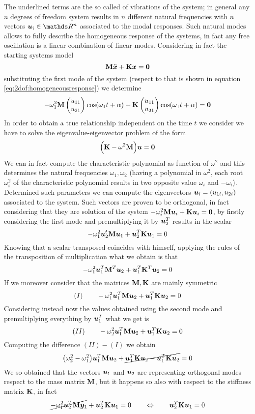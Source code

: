 	The underlined terms are the so called  of vibrations of the system; in general any $n$ degrees of freedom system results in $n$ different natural frequencies with $n$  vectors $\vett u_i \in \mathds R^n$ associated to the modal responses. Such natural modes allows to fully describe the homogeneous response of the systems, in fact any free oscillation is a linear combination of linear modes. Considering in fact the starting systems model
	\[ \mathbf{M} \ddot{\boldsymbol{x}} + \mathbf{K} \boldsymbol{x}= \boldsymbol{0} \]
	substituting the first mode of the system (respect to that is shown in equation \ref{eq:2dof:homogeneousresponse}) we determine
	\[ -\omega_1^2 \mathbf{M} \begin{pmatrix} u_{11} \\ u_{21} \end{pmatrix} \cos(\omega_1 t + \alpha)  + \mathbf{K} \begin{pmatrix} u_{11} \\ u_{21} \end{pmatrix} \cos(\omega_1 t + \alpha) = \boldsymbol{0}  \]
	In order to obtain a true relationship independent on the time $t$ we consider we have to solve the eigenvalue-eigenvector problem of the form
	\[ \Big(\mathbf{K} - \omega^2 \mathbf{M}\Big) \boldsymbol{u} = \boldsymbol{0} \]
	We can in fact compute the characteristic polynomial as function of $\omega^2$ and this determines the natural frequencies $\omega_1, \omega_2$  (having a polynomial in $\omega^2$, each root $\omega_i^2$ of the characteristic polynomial results in two opposite value $\omega_i$ and $-\omega_i$). Determined such parameters we can compute the eigenvectors $\boldsymbol{u}_i = (u_{1i}, u_{2i})$ associated to the system. Such vectors are proven to be orthogonal, in fact considering that they are solution of the system $-\omega_i^2 \mathbf{M} \boldsymbol{u}_i + \mathbf{K} \boldsymbol{u}_i = \boldsymbol{0}$, by firstly considering the first mode and premultiplying it by $\boldsymbol{u}_2^T$ results in the scalar
	\[ -\omega_1^2  \boldsymbol{u}_2^t \mathbf{M} \boldsymbol{u}_1 + \boldsymbol{u}_2^T \mathbf{K} \boldsymbol{u}_1 = 0 \]
	Knowing that a scalar transposed coincides with himself, applying the rules of the transposition of multiplication what we obtain is that
	\[ -\omega_1^2 \boldsymbol{u}_1^T\mathbf{M}^T \boldsymbol{u}_2 + \boldsymbol{u}_1^T \mathbf{K}^T \boldsymbol{u}_2 = 0 \]
	If we moreover consider that the matrices $\mathbf{M},\mathbf{K}$ are mainly symmetric	
	\[ (I) \qquad -\omega_1^2 \boldsymbol{u}_1^T\mathbf{M} \boldsymbol{u}_2 + \boldsymbol{u}_1^T \mathbf{K} \boldsymbol{u}_2 = 0 \]
	Considering instead now the values obtained using the second mode and premultiplying everything by $\boldsymbol{u}_1^T$ what we get is
	\[ (II) \qquad -\omega_2^2 \boldsymbol{u}_1^T \mathbf{M} \boldsymbol{u}_2 + \boldsymbol{u}_1^T \mathbf{K} \boldsymbol{u}_2 = 0 \]
	Computing the difference $(II)-(I)$ we obtain
	\[ \big(\omega_2^2-\omega_1^2\big) \boldsymbol{u}_1^T \mathbf{M} \boldsymbol{u}_2 + \cancel{\boldsymbol{u}_1^T \mathbf{K} \boldsymbol{u}_2 - \boldsymbol{u}_1^T \mathbf{K} \boldsymbol{u}_2 } = 0  \]
	We so obtained that the vectors $\boldsymbol{u}_1$ and $\boldsymbol{u}_2$ are representing orthogonal modes respect to the mass matrix $\mathbf{M}$, but it happens so also with respect to the stiffness matrix $\mathbf{K}$, in fact
	\[ \cancel{-\omega_1^2 \boldsymbol{u}_2^T \mathbf{M} \boldsymbol{y}_1} + \boldsymbol{u}_2^T \mathbf{K} \boldsymbol{u}_1 = 0 \qquad \Leftrightarrow \qquad \boldsymbol{u}_2^T \mathbf{K} \boldsymbol{u}_1 = 0  \]	
	
